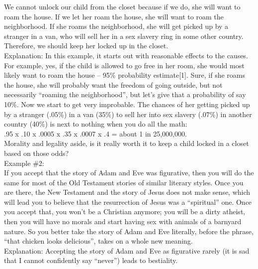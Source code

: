 \documentclass[a4paper,12pt,single,pdftex]{scrartcl}
\begin{document}
    
      We cannot unlock our child from the closet because if we do, she will want to roam the house.  If we let her roam the house, she will want to roam the neighborhood.  If she roams the neighborhood, she will get picked up by a stranger in a van, who will sell her in a sex slavery ring in some other country.  Therefore, we should keep her locked up in the closet.
    \\

    
      Explanation: In this example, it starts out with reasonable effects to the causes.  For example, yes, if the child is allowed to go free in her room, she would most likely want to roam the house -- 95\% probability estimate[1].  Sure, if she roams the house, she will probably want the freedom of going outside, but not necessarily “roaming the neighborhood”, but let’s give that a probability of say 10\%.  Now we start to get very improbable.  The chances of her getting picked up by a stranger (.05\%) in a van (35\%) to sell her into sex slavery (.07\%) in another country (40\%) is next to nothing when you do all the math:
    \\

    
      .95 x .10 x .0005 x .35 x .0007 x .4 = about 1 in 25,000,000.
    \\

    
      Morality and legality aside, is it really worth it to keep a child locked in a closet based on those odds?
    \\

    
      Example \#2:
    \\

    
      If you accept that the story of Adam and Eve was figurative, then you will do the same for most of the Old Testament stories of similar literary styles.  Once you are there, the New Testament and the story of Jesus does not make sense, which will lead you to believe that the resurrection of Jesus was a “spiritual” one.  Once you accept that, you won’t be a Christian anymore; you will be a dirty atheist, then you will have no morals and start having sex with animals of a barnyard nature.  So you better take the story of Adam and Eve literally, before the phrase, “that chicken looks delicious”, takes on a whole new meaning.
    \\

    
      Explanation: Accepting the story of Adam and Eve as figurative rarely (it is sad that I cannot confidently say “never”) leads to bestiality.
    \\
\end{document}
